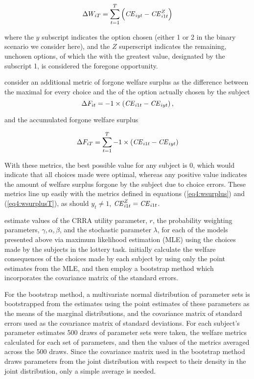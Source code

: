 \documentclass[../main.tex]{subfiles}
\begin{document}
\begin{equation}
	\label{eq4:wsurplusT}
	\Delta W_{iT} = \sum_{t=1}^T \left( {\mathit{CE}}_{iyt} - {\mathit{CE}}_{i1t}^Z \right)
\end{equation}

\noindent where the $y$ subscript indicates the option chosen (either 1 or 2 in the binary scenario we consider here), and the $Z$ superscript indicates the remaining, unchosen options, of which the {\CE} with the greatest value, designated by the subscript 1, is considered the foregone opportunity.

\textcite[106]{Harrison2016} consider an additional metric of forgone welfare surplus as the difference between the maximal {\CE} for every choice and the {\CE} of the option actually chosen by the subject
\begin{equation}
	\label{eq4:wforgone}
	\Delta F_{it} = -1 \times \left( {\mathit{CE}}_{i1t} - {\mathit{CE}}_{iyt} \right) , 
\end{equation}

\noindent and the accumulated forgone welfare surplus

\begin{equation}
	\label{eq4:wforgoneT}
	\Delta F_{iT} = \sum_{t=1}^T  -1 \times \left( {\mathit{CE}}_{i1t} - {\mathit{CE}}_{iyt} \right)
\end{equation}

\noindent With these metrics, the best possible value for any subject is 0, which would indicate that all choices made were optimal, whereas any positive value indicates the amount of welfare surplus forgone by the subject due to choice errors.
These metrics line up easily with the metrics defined in equations (\ref{eq4:wsurplus}) and (\ref{eq4:wsurplusT}), as should $y_t \neq 1$, ${\mathit{CE}}_{i1t}^Z = {\mathit{CE}}_{i1t}$.

\textcite{Harrison2016} estimate values of the CRRA utility parameter, $r$, the probability weighting parameters, $\gamma, \alpha, \beta$, and the stochastic parameter $\lambda$, for each of the models presented above via maximum likelihood estimation (MLE) using the choices made by the subjects in the lottery task.
\textcite[107,110]{Harrison2016} initially calculate the welfare consequences of the choices made by each subject by using only the point estimates from the MLE, and then employ a bootstrap method which incorporates the covariance matrix of the standard errors.

For the bootstrap method, a multivariate normal distribution of parameter sets is bootstrapped from the estimates using the point estimates of these parameters as the means of the marginal distributions, and the covariance matrix of standard errors used as the covariance matrix of standard deviations.
For each subject's parameter estimates 500 draws of parameter sets were taken, the welfare metrics calculated for each set of parameters, and then the values of the metrics averaged across the 500 draws.
Since the covariance matrix used in the bootstrap method draws parameters from the joint distribution with respect to their density in the joint distribution, only a simple average is needed.
\end{document}
